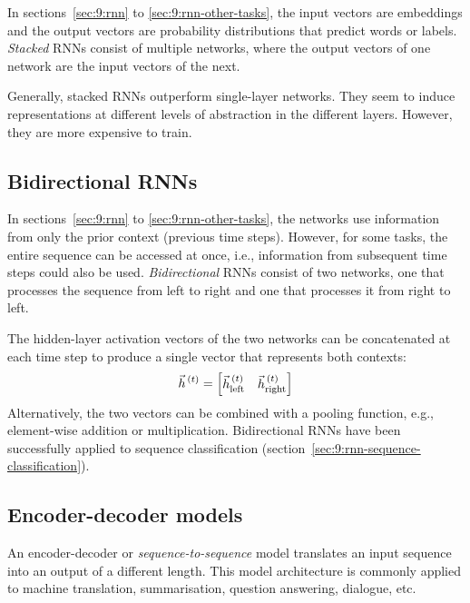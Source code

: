 In sections~\ref{sec:9:rnn} to \ref{sec:9:rnn-other-tasks}, the input vectors
are embeddings and the output vectors are probability distributions that
predict words or labels.
\textit{Stacked}
RNNs consist of multiple networks, where the output vectors of one network are
the input vectors of the next.

Generally, stacked RNNs outperform single-layer networks.
They seem to induce representations at different levels of abstraction in the
different layers.
However, they are more expensive to train.

\subsection{Bidirectional RNNs}

In sections~\ref{sec:9:rnn} to \ref{sec:9:rnn-other-tasks}, the networks use
information from only the prior context (previous time steps).
However, for some tasks, the entire sequence can be accessed at once, i.e.,
information from subsequent time steps could also be used.
\textit{Bidirectional}
RNNs consist of two networks, one that processes the sequence from left to
right and one that processes it from right to left.

The hidden-layer activation vectors of the two networks can be concatenated at
each time step to produce a single vector that represents both contexts:
\begin{equation}
  \vec{h}^{\,(t)} =
  \begin{bmatrix}
    \vec{h}^{\,(t)}_\text{left} & \vec{h}^{\,(t)}_\text{right}
  \end{bmatrix}
\end{equation}
Alternatively, the two vectors can be combined with a pooling function, e.g.,
element-wise addition or multiplication.
Bidirectional RNNs have been successfully applied to sequence classification
(section~\ref{sec:9:rnn-sequence-classification}).

\subsection{Encoder-decoder models}

An encoder-decoder or \textit{sequence-to-sequence} model translates an input
sequence into an output of a different length.
This model architecture is commonly applied to machine translation,
summarisation, question answering, dialogue, etc.

